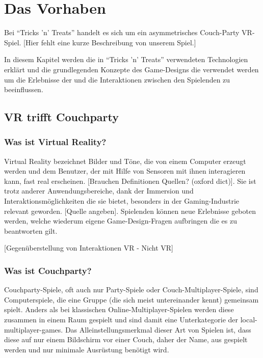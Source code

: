 \chapter{Das Vorhaben}
\label{cha:sa_Einleitung}

Bei "`Tricks 'n' Treats"' handelt es sich um ein asymmetrisches Couch-Party VR-Spiel. [Hier fehlt eine kurze Beschreibung von unserem Spiel.]

In diesem Kapitel werden die in "`Tricks 'n' Treats"' verwendeten Technologien erklärt und die grundlegenden Konzepte des Game-Designs die verwendet werden um die  Erlebnisse der und die Interaktionen zwischen den Spielenden zu beeinflussen.

\section{VR trifft Couchparty}

\subsection{Was ist Virtual Reality?}

Virtual Reality bezeichnet Bilder und Töne, die von einem Computer erzeugt werden und dem Benutzer, der mit Hilfe von Sensoren mit ihnen interagieren kann, fast real erscheinen. [Brauchen Definitionen Quellen? (oxford dict)]. Sie ist trotz anderer Anwendungsbereiche, dank der Immersion und Interaktionsmöglichkeiten die sie bietet, besonders in der Gaming-Industrie relevant geworden. [Quelle angeben]. Spielenden können neue Erlebnisse geboten werden, welche wiederum eigene  Game-Design-Fragen aufbringen die es zu beantworten gilt.

[Gegenüberstellung von Interaktionen VR - Nicht VR]

\subsection{Was ist Couchparty?}

Couchparty-Spiele, oft auch nur Party-Spiele oder Couch-Multiplayer-Spiele, sind Computerspiele, die eine Gruppe (die sich meist untereinander kennt) gemeinsam spielt. Anders als bei klassischen Online-Multiplayer-Spielen werden diese zusammen in einem Raum gespielt und sind damit eine Unterkategorie der local-multiplayer-games. Das Alleinstellungsmerkmal dieser Art von Spielen ist, dass diese auf nur einem Bildschirm vor einer Couch, daher der Name, aus gespielt werden und nur minimale Ausrüstung benötigt wird.

